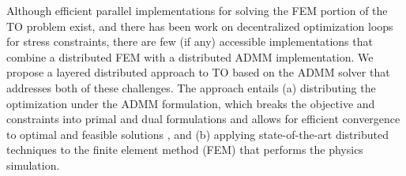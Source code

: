 \documentclass[12pt]{article}
\begin{document}
Although efficient parallel implementations for solving the FEM portion of the TO problem exist, and there has been work on decentralized optimization loops for stress constraints, there are few (if any) accessible implementations that combine a distributed FEM with a distributed ADMM implementation. We propose a layered distributed approach to TO based on the ADMM solver that addresses both of these challenges. The approach entails (a) distributing the optimization under the ADMM formulation, which breaks the objective and constraints into primal and dual formulations and allows for efficient convergence to optimal and feasible solutions \parencite{zhaiAlternatingOptimizationDesign2021}, and (b) applying state-of-the-art distributed techniques to the finite element method (FEM) that performs the physics simulation. 

\printbibliography  %
\end{document}
